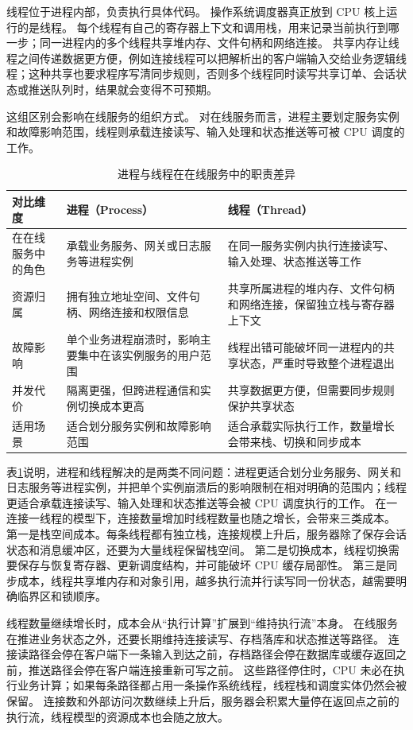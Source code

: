 线程位于进程内部，负责执行具体代码。
操作系统调度器真正放到 CPU 核上运行的是线程。
每个线程有自己的寄存器上下文和调用栈，用来记录当前执行到哪一步；同一进程内的多个线程共享堆内存、文件句柄和网络连接。
共享内存让线程之间传递数据更方便，例如连接线程可以把解析出的客户端输入交给业务逻辑线程；这种共享也要求程序写清同步规则，否则多个线程同时读写共享订单、会话状态或推送队列时，结果就会变得不可预期。

这组区别会影响在线服务的组织方式。
对在线服务而言，进程主要划定服务实例和故障影响范围，线程则承载连接读写、输入处理和状态推送等可被 CPU 调度的工作。

\begin{table}[H]
\centering
\caption{进程与线程在在线服务中的职责差异}
\label{tab:process-thread}
\begin{tabular}{p{2.8cm}p{5.6cm}p{5.6cm}}
\hline
对比维度 & 进程（Process） & 线程（Thread） \\
\hline
在在线服务中的角色 & 承载业务服务、网关或日志服务等进程实例 & 在同一服务实例内执行连接读写、输入处理、状态推送等工作 \\
资源归属 & 拥有独立地址空间、文件句柄、网络连接和权限信息 & 共享所属进程的堆内存、文件句柄和网络连接，保留独立栈与寄存器上下文 \\
故障影响 & 单个业务进程崩溃时，影响主要集中在该实例服务的用户范围 & 线程出错可能破坏同一进程内的共享状态，严重时导致整个进程退出 \\
并发代价 & 隔离更强，但跨进程通信和实例切换成本更高 & 共享数据更方便，但需要同步规则保护共享状态 \\
适用场景 & 适合划分服务实例和故障影响范围 & 适合承载实际执行工作，数量增长会带来栈、切换和同步成本 \\
\hline
\end{tabular}
\end{table}

表\ref{tab:process-thread}说明，进程和线程解决的是两类不同问题：进程更适合划分业务服务、网关和日志服务等进程实例，并把单个实例崩溃后的影响限制在相对明确的范围内；线程更适合承载连接读写、输入处理和状态推送等会被 CPU 调度执行的工作。
在一连接一线程的模型下，连接数量增加时线程数量也随之增长，会带来三类成本。
第一是栈空间成本。每条线程都有独立栈，连接规模上升后，服务器除了保存会话状态和消息缓冲区，还要为大量线程保留栈空间。
第二是切换成本，线程切换需要保存与恢复寄存器、更新调度结构，并可能破坏 CPU 缓存局部性。
第三是同步成本，线程共享堆内存和对象引用，越多执行流并行读写同一份状态，越需要明确临界区和锁顺序。

线程数量继续增长时，成本会从“执行计算”扩展到“维持执行流”本身。
在线服务在推进业务状态之外，还要长期维持连接读写、存档落库和状态推送等路径。
连接读路径会停在客户端下一条输入到达之前，存档路径会停在数据库或缓存返回之前，推送路径会停在客户端连接重新可写之前。
这些路径停住时，CPU 未必在执行业务计算；如果每条路径都占用一条操作系统线程，线程栈和调度实体仍然会被保留。
连接数和外部访问次数继续上升后，服务器会积累大量停在返回点之前的执行流，线程模型的资源成本也会随之放大。


